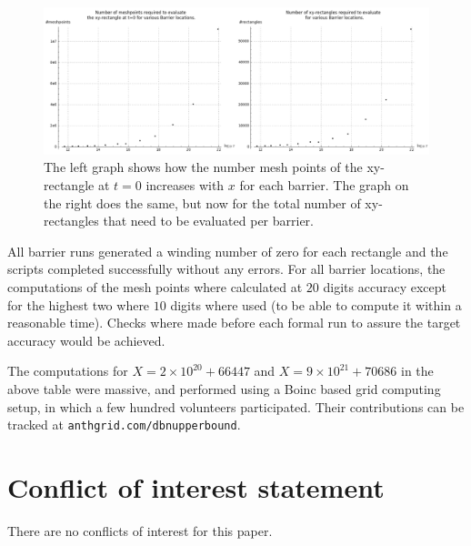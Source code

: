 \documentclass[a4paper,11pt,twoside]{amsart}
\begin{document}
\begin{figure}[!ht]
  \includegraphics[width=1.0\linewidth]{mesh_rectangles_at_barrierlocs.png}
  \caption{The left graph shows how the number mesh points of the xy-rectangle at $t=0$ increases with $x$ for each barrier. The graph on the right does the same, but now for the total number of xy-rectangles that need to be evaluated per barrier. }
  \label{fig:meshbarrier}
\end{figure}

All barrier runs generated a winding number of zero for each rectangle and the scripts completed successfully without any errors. For all barrier locations, the computations of the mesh points where calculated at $20$ digits accuracy except for the highest two where $10$ digits where used (to be able to compute it within a reasonable time). Checks where made before each formal run to assure the target accuracy would be achieved. 

The computations for $X=2 \times 10^{20} + 66447$ and $X=9 \times 10^{21} + 70686$ in the above table were massive, and performed using a Boinc \cite{anderson} based grid computing setup, in which a few hundred volunteers participated. Their contributions can be tracked at {\tt anthgrid.com/dbnupperbound}.

\section{Conflict of interest statement}

There are no conflicts of interest for this paper.
\end{document}

